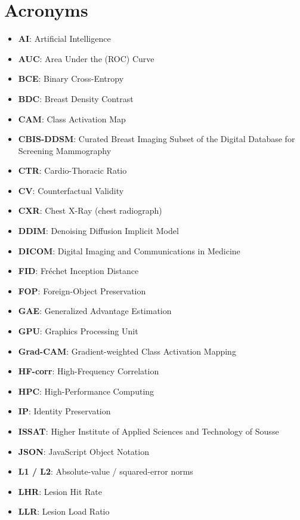 \chapter*{Acronyms}

\begin{itemize}[leftmargin=1.4em,itemsep=2pt]
  \item \textbf{AI}: Artificial Intelligence
  \item \textbf{AUC}: Area Under the (ROC) Curve
  \item \textbf{BCE}: Binary Cross-Entropy
  \item \textbf{BDC}: Breast Density Contrast
  \item \textbf{CAM}: Class Activation Map
  \item \textbf{CBIS-DDSM}: Curated Breast Imaging Subset of the Digital
        Database for Screening Mammography
  \item \textbf{CTR}: Cardio-Thoracic Ratio
  \item \textbf{CV}: Counterfactual Validity
  \item \textbf{CXR}: Chest X-Ray (chest radiograph)
  \item \textbf{DDIM}: Denoising Diffusion Implicit Model
  \item \textbf{DICOM}: Digital Imaging and Communications in Medicine
  \item \textbf{FID}: Fr\'echet Inception Distance
  \item \textbf{FOP}: Foreign-Object Preservation
  \item \textbf{GAE}: Generalized Advantage Estimation
  \item \textbf{GPU}: Graphics Processing Unit
  \item \textbf{Grad-CAM}: Gradient-weighted Class Activation Mapping
  \item \textbf{HF-corr}: High-Frequency Correlation
  \item \textbf{HPC}: High-Performance Computing
  \item \textbf{IP}: Identity Preservation
  \item \textbf{ISSAT}: Higher Institute of Applied Sciences and Technology of Sousse
  \item \textbf{JSON}: JavaScript Object Notation
  \item \textbf{L1 / L2}: Absolute-value / squared-error norms
  \item \textbf{LHR}: Lesion Hit Rate
  \item \textbf{LLR}: Lesion Load Ratio

\end{itemize}
